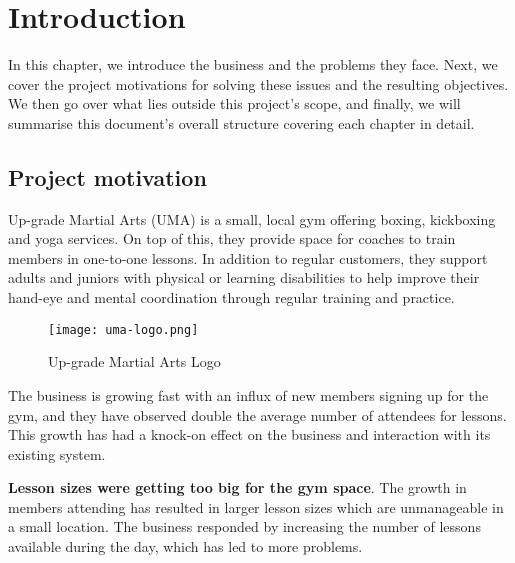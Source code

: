 \chapter{Introduction} %
\label{Chapter1} %

In this chapter, we introduce the business and the problems they face. Next, we cover the project motivations for solving these issues and the resulting objectives. We then go over what lies outside this project's scope, and finally, we will summarise this document's overall structure covering each chapter in detail.

\section{Project motivation}
Up-grade Martial Arts (UMA) is a small, local gym offering boxing, kickboxing and yoga services. On top of this, they provide space for coaches to train members in one-to-one lessons. In addition to regular customers, they support adults and juniors with physical or learning disabilities to help improve their hand-eye and mental coordination through regular training and practice.\\

\begin{figure}[h!]
    \centerline{\texttt{[image: uma-logo.png]}}
    \caption{Up-grade Martial Arts Logo}
    \label{fig:umalogo}
\end{figure}

The business is growing fast with an influx of new members signing up for the gym, and they have observed double the average number of attendees for lessons. This growth has had a knock-on effect on the business and interaction with its existing system.

\textbf{Lesson sizes were getting too big for the gym space}. The growth in members attending has resulted in larger lesson sizes which are unmanageable in a small location. The business responded by increasing the number of lessons available during the day, which has led to more problems.


